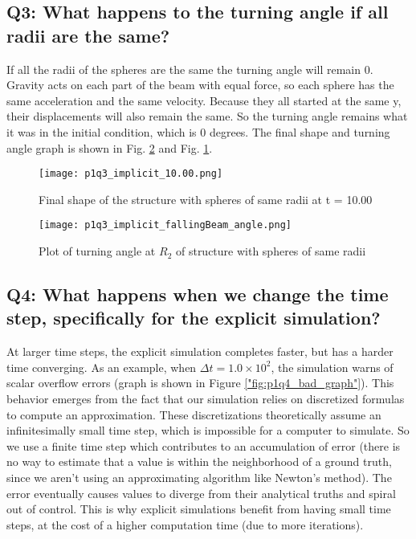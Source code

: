 \documentclass[letterpaper, 10 pt, conference]{ieeeconf}  %
\begin{document}
\subsection*{ Q3: What happens to the turning angle if all radii are the same? }

If all the radii of the spheres are the same the turning angle will remain 0. Gravity acts on each part of the beam with equal force, so each sphere has the same acceleration and the same velocity. Because they all started at the same y, their displacements will also remain the same. So the turning angle remains what it was in the initial condition, which is 0 degrees. The final shape and turning angle graph is shown in Fig. \ref{"fig:p1q3_turning_angle"} and Fig. \ref{"fig:p1q3_final_shape"}.

\begin{figure}[!ht]
        \centering
        \texttt{[image: p1q3\_implicit\_10.00.png]}
        \caption{Final shape of the structure with spheres of same radii at t = 10.00}
        \label{"fig:p1q3_final_shape"}
\end{figure}

\begin{figure}[!ht]
        \centering
        \texttt{[image: p1q3\_implicit\_fallingBeam\_angle.png]}
        \caption{Plot of turning angle at $R_2$ of structure with spheres of same radii}
        \label{"fig:p1q3_turning_angle"}
\end{figure}


\subsection*{ Q4: What happens when we change the time step, specifically for the explicit simulation?}
At larger time steps, the explicit simulation completes faster, but has a harder time converging. As an example, when $\Delta t = 1.0 \times  10^2$, the simulation warns of scalar overflow errors (graph is shown in Figure \ref{"fig:p1q4_bad_graph"}). This behavior emerges from the fact that our simulation relies on discretized formulas to compute an approximation. These discretizations theoretically assume an infinitesimally small time step, which is impossible for a computer to simulate. So we use a finite time step which contributes to an accumulation of error (there is no way to estimate that a value is within the neighborhood of a ground truth, since we aren't using an approximating algorithm like Newton's method). The error eventually causes values to diverge from their analytical truths and spiral out of control. This is why explicit simulations benefit from having small time steps, at the cost of a higher computation time (due to more iterations).
\end{document}
